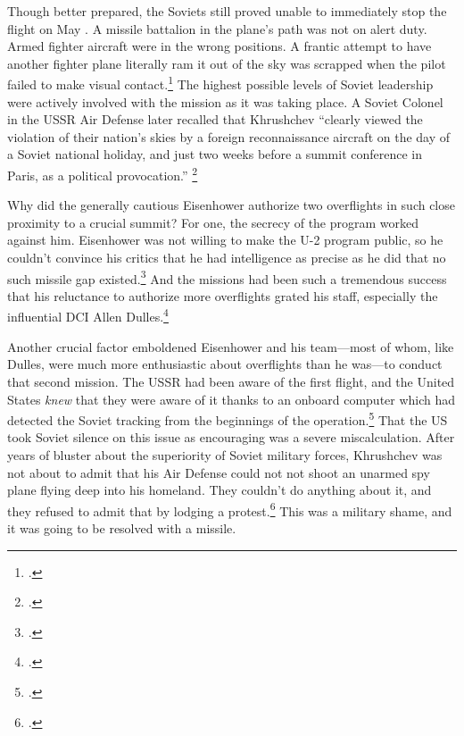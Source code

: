 \documentclass[12pt]{article}
\begin{document}
Though better prepared, the Soviets still proved unable to immediately stop the flight on May . A missile battalion in the plane's path was not on alert duty. Armed fighter aircraft were in the wrong positions. A frantic attempt to have another fighter plane literally ram it out of the sky was scrapped when the pilot failed to make visual contact.\footcite{orlov_u-2_2007} The highest possible levels of Soviet leadership were actively involved with the mission as it was taking place. A Soviet Colonel in the USSR Air Defense later recalled that Khrushchev ``clearly viewed the violation of their nation's skies by a foreign reconnaissance aircraft on the day of a Soviet national holiday, and just two weeks before a summit conference in Paris, as a political provocation.'' \footcite{orlov_u-2_2007}

Why did the generally cautious Eisenhower authorize two overflights in such close proximity to a crucial summit? For one, the secrecy of the program worked against him. Eisenhower was not willing to make the U-2 program public, so he couldn't convince his critics that he had intelligence as precise as he did that no such missile gap existed.\footcite[p.~51]{lindgren_trust_2000} And the missions had been such a tremendous success that his reluctance to authorize more overflights grated his staff, especially the influential DCI Allen Dulles.\footcite[p.~354]{brugioni_eyes_2010}

Another crucial factor emboldened Eisenhower and his team---most of whom, like Dulles, were much more enthusiastic about overflights than he was---to conduct that second mission. The USSR had been aware of the first flight, and the United States \emph{knew} that they were aware of it thanks to an onboard computer which had detected the Soviet tracking from the beginnings of the operation.\footcite{pedlow_cia_1998} That the US took Soviet silence on this issue as encouraging was a severe miscalculation. After years of bluster about the superiority of Soviet military forces, Khrushchev was not about to admit that his Air Defense could not not shoot an unarmed spy plane flying deep into his homeland. They couldn't do anything about it, and they refused to admit that by lodging a protest.\footcite[p.~59]{powers_operation_2004} This was a military shame, and it was going to be resolved with a missile.
\end{document}
